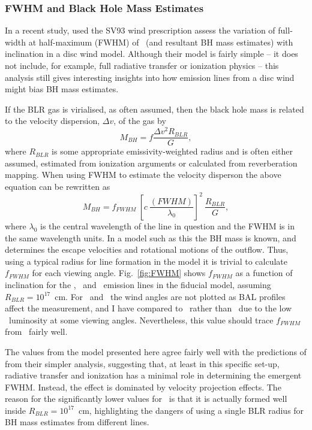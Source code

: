 \subsubsection{FWHM and Black Hole Mass Estimates}

In a recent study, \cite{yong2016} used the SV93 wind prescription
assess the variation of full-width at half-maximum (FWHM) of 
\hb\ (and resultant BH mass estimates)
with inclination in a disc wind model. 
Although their model is fairly simple -- 
it does not include, for example, full radiative transfer or ionization physics --
this analysis still gives interesting insights into how emission lines
from a disc wind might bias BH mass estimates.

If the BLR gas is virialised, as often assumed, then the black hole mass
is related to the velocity dispersion, $\Delta v$, of the gas by
\begin{equation}
M_{BH} = f \frac{\Delta v^2 R_{BLR}}{G},
\end{equation}
where $R_{BLR}$ is some appropriate emissivity-weighted radius and is often 
either assumed, estimated from ionization arguments or calculated from reverberation
mapping. When using FWHM to estimate the velocity disperson the above
equation can be rewritten as
\begin{equation}
M_{BH} = f_{FWHM}~\left[c~\frac{(FWHM)}{\lambda_0}\right]^2~\frac{R_{BLR}}{G},
\end{equation}
where $\lambda_0$ is the central wavelength of the line in question
and the FWHM is in the same wavelength units.
In a model such as this the BH mass is known, and determines
the escape velocities and rotational motions of the outflow. Thus, 
using a typical radius for line formation in the model it is trivial to 
calculate $f_{FWHM}$ for each viewing angle. Fig.~\ref{fig:FWHM}
shows $f_{FWHM}$ as a function of inclination for the 
\civ, \mg\ and \ha\ emission lines in the fiducial model, 
assuming $R_{BLR}=10^{17}$~cm. 
For \civ\ and \mg\ the wind angles are not plotted as BAL profiles affect 
the measurement, and I have compared to \ha\ rather than \hb\ due to the
low \hb\ luminosity at some viewing angles. Nevertheless,
this value should trace $f_{FWHM}$ from \hb\ fairly well.

The values from the model presented here agree fairly well with the predictions
of \cite{yong2016} from their simpler analysis, suggesting that,
at least in this specific set-up,
radiative transfer and ionization has a minimal role in determining
the emergent FWHM. Instead, the effect is dominated by velocity projection
effects. The reason for the significantly lower values for \mgii\ is that
it is actually formed well inside $R_{BLR}=10^{17}$~cm, highlighting
the dangers of using a single BLR radius for BH mass estimates
from different lines.

